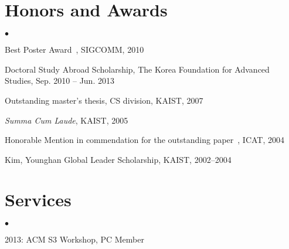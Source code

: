 \documentclass[margin,line]{res}
\newenvironment{list1}{
  \begin{list}{\ding{113}}{%
      \setlength{\itemsep}{0in}
      \setlength{\parsep}{0in} \setlength{\parskip}{0in}
      \setlength{\topsep}{0in} \setlength{\partopsep}{0in}
      \setlength{\leftmargin}{0.17in}}}{\end{list}}
\newenvironment{list2}{
  \begin{list}{$\bullet$}{%
      \setlength{\itemsep}{0in}
      \setlength{\parsep}{0in} \setlength{\parskip}{0in}
      \setlength{\topsep}{0in} \setlength{\partopsep}{0in}
      \setlength{\leftmargin}{0.2in}}}{\end{list}}
\begin{document}
\begin{resume}
\section{\sc Honors and Awards} 
\begin{list2}
\item{Best Poster Award~\cite{sigcomm10}, SIGCOMM, 2010}
\item{Doctoral Study Abroad Scholarship, The Korea Foundation for Advanced Studies, Sep. 2010 -- Jun. 2013 }
\item{Outstanding master's thesis, CS division, KAIST, 2007}
\item{\textit{Summa Cum Laude}, KAIST, 2005}
\item{Honorable Mention in commendation for the outstanding paper~\cite{icat04}, ICAT, 2004}
\item{Kim, Younghan Global Leader Scholarship, KAIST, 2002--2004}
\end{list2}





\section{\sc Services}
\begin{list2}
\item{2013: ACM S3 Workshop, PC Member} 
\end{list2}



\end{resume}
\end{document}
